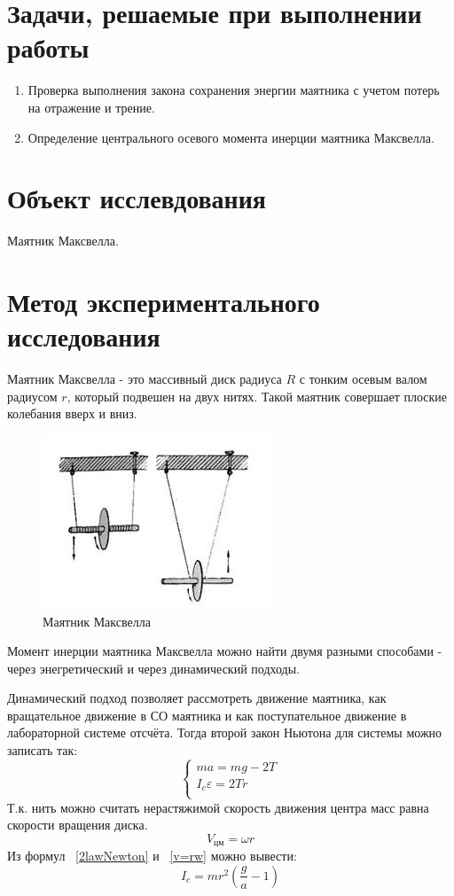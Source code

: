 \documentclass[a4paper]{article}
\begin{document}
\section{Задачи, решаемые при выполнении работы}
\begin{enumerate}
    \item Проверка выполнения закона сохранения энергии маятника с
учетом потерь на отражение и трение.
    \item Определение центрального осевого момента инерции маятника
Максвелла.
\end{enumerate}

\section{Объект исслевдования}
Маятник Максвелла.

\section{Метод экспериментального исследования}
Маятник Максвелла - это массивный диск радиуса $R$ с тонким осевым валом радиусом $r$, который подвешен на двух нитях. Такой маятник совершает плоские колебания вверх и вниз.

\begin{figure} 
\includegraphics[scale=0.5]{mayatnik.jpg}
\caption{Маятник Максвелла}
\end{figure}
\medbreak
Момент инерции маятника Максвелла можно найти двумя разными способами - через энегретический и через динамический подходы. 

\medbreak
$\textbf{Динамический подход}$ позволяет рассмотреть движение маятника, как вращательное движение в СО маятника и как поступательное движение в лабораторной системе отсчёта. Тогда второй закон Ньютона для системы можно записать так:
\begin{equation}
    \left\{ 
        \begin{array}{l}
           ma = mg - 2T\\
           I_c \varepsilon = 2Tr\\
        \end{array}
        \right.
    \label{2lawNewton}
\end{equation}
Т.к. нить можно считать нерастяжимой скорость движения центра масс равна скорости вращения диска.
\begin{equation}
    V_{цм} = \omega r
    \label{v=rw}
\end{equation}
Из формул ~\ref{2lawNewton} и ~\ref{v=rw} можно вывести: \[I_c = m r^2(\frac{g}{a}-1)\]
\end{document}
